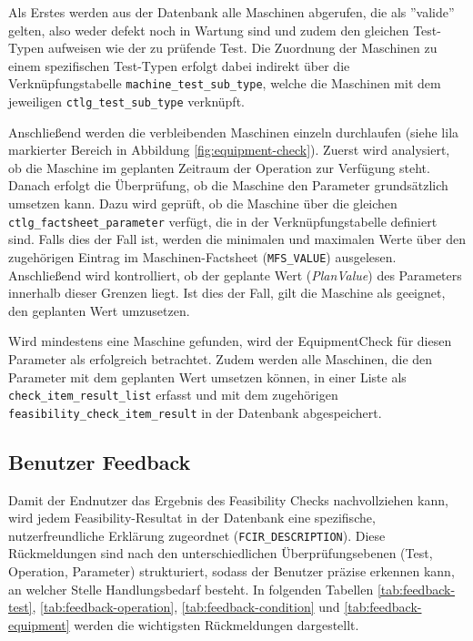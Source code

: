 Als Erstes werden aus der Datenbank alle Maschinen abgerufen, die als ''valide'' gelten, also weder defekt noch in Wartung sind und zudem den gleichen Test-Typen aufweisen wie der zu prüfende Test. Die Zuordnung der Maschinen zu einem spezifischen Test-Typen erfolgt dabei indirekt über die Verknüpfungstabelle \texttt{machine\_\-test\_\-sub\_type}, welche die Maschinen mit dem jeweiligen \texttt{ctlg\_test\_sub\_type} verknüpft.

Anschließend werden die verbleibenden Maschinen einzeln durchlaufen (siehe lila markierter Bereich in Abbildung \ref{fig:equipment-check}). Zuerst wird analysiert, ob die Maschine im geplanten Zeitraum der Operation zur Verfügung steht. Danach erfolgt die Überprüfung, ob die Maschine den Parameter grundsätzlich umsetzen kann. Dazu wird geprüft, ob die Maschine über die gleichen \texttt{ctlg\_factsheet\_parameter} verfügt, die in der Verknüpfungstabelle definiert sind. Falls dies der Fall ist, werden die minimalen und maximalen Werte über den zugehörigen Eintrag im Maschinen-Factsheet (\texttt{MFS\_VALUE}) ausgelesen. Anschließend wird kontrolliert, ob der geplante Wert (\textit{PlanValue}) des Parameters innerhalb dieser Grenzen liegt. Ist dies der Fall, gilt die Maschine als geeignet, den geplanten Wert umzusetzen. 

Wird mindestens eine Maschine gefunden, wird der \gls{EquipmentCheck} für diesen Parameter als erfolgreich betrachtet. Zudem werden alle Maschinen, die den Parameter mit dem geplanten Wert umsetzen können, in einer Liste als \texttt{check\_item\_\-result\_\-list} erfasst und mit dem zugehörigen \texttt{feasibility\_check\_item\_result} in der Datenbank abgespeichert.


\subsection{Benutzer Feedback}\label{Subsec:user-feedback}

Damit der Endnutzer das Ergebnis des Feasibility Checks nachvollziehen kann, wird jedem Feasibility-Resultat in der Datenbank eine spezifische, nutzerfreundliche Erklärung zugeordnet (\texttt{FCIR\_DESCRIPTION}). Diese Rückmeldungen sind nach den unterschiedlichen Überprüfungsebenen (Test, Operation, Parameter) strukturiert, sodass der Benutzer präzise erkennen kann, an welcher Stelle Handlungsbedarf besteht. In folgenden Tabellen \ref{tab:feedback-test}, \ref{tab:feedback-operation}, \ref{tab:feedback-condition} und \ref{tab:feedback-equipment} werden die wichtigsten Rückmeldungen dargestellt.

